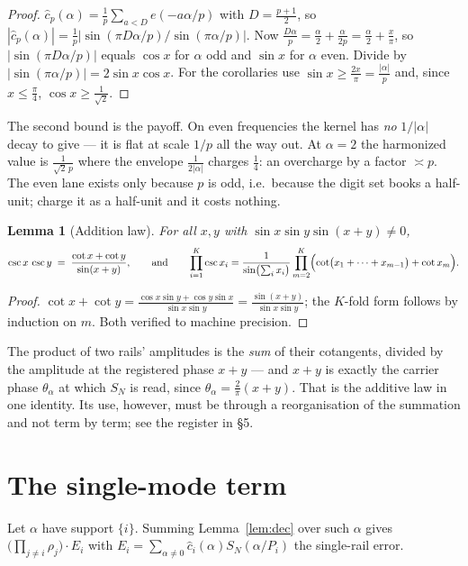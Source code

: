 \documentclass[11pt]{article}
\newtheorem{lemma}[theorem]{Lemma}
\newcommand{\e}[1]{e\!\left(#1\right)}
\begin{document}
\begin{proof}
$\hat c_p(\alpha)=\frac1p\sum_{a<D}\e{-a\alpha/p}$ with $D=\frac{p+1}2$, so
$|\hat c_p(\alpha)|=\frac1p\bigl|\sin(\pi D\alpha/p)/\sin(\pi\alpha/p)\bigr|$.  Now
$\frac{D\alpha}{p}=\frac\alpha2+\frac{\alpha}{2p}=\frac\alpha2+\frac x\pi$, so
$|\sin(\pi D\alpha/p)|$ equals $\cos x$ for $\alpha$ odd and $\sin x$ for $\alpha$ even.
Divide by $|\sin(\pi\alpha/p)|=2\sin x\cos x$.  For the corollaries use
$\sin x\ge\frac{2x}\pi=\frac{|\alpha|}p$ and, since $x\le\frac\pi4$,
$\cos x\ge\frac1{\sqrt2}$.
\end{proof}

The second bound is the payoff.  On even frequencies the kernel has \emph{no} $1/|\alpha|$
decay to give --- it is flat at scale $1/p$ all the way out.  At $\alpha=2$ the
harmonized value is $\frac1{\sqrt2\,p}$ where the envelope $\frac1{2|\alpha|}$ charges
$\frac14$: an overcharge by a factor $\asymp p$.  The even lane exists only because $p$
is odd, i.e.\ because the digit set books a half-unit; charge it as a half-unit and it
costs nothing.

\begin{lemma}[Addition law]\label{lem:add}
For all $x,y$ with $\sin x\sin y\sin(x+y)\ne0$,
\[
\csc x\,\csc y\;=\;\frac{\cot x+\cot y}{\sin(x+y)},
\qquad\text{and}\qquad
\prod_{i=1}^K\csc x_i=\frac{1}{\sin\bigl(\sum_ix_i\bigr)}\prod_{m=2}^{K}
\Bigl(\cot\bigl(x_1+\dots+x_{m-1}\bigr)+\cot x_m\Bigr).
\]
\end{lemma}

\begin{proof}
$\cot x+\cot y=\frac{\cos x\sin y+\cos y\sin x}{\sin x\sin y}=\frac{\sin(x+y)}{\sin x\sin y}$;
the $K$-fold form follows by induction on $m$.  Both verified to machine precision.
\end{proof}

The product of two rails' amplitudes is the \emph{sum} of their cotangents, divided by
the amplitude at the registered phase $x+y$ --- and $x+y$ is exactly the carrier phase
$\theta_\alpha$ at which $S_N$ is read, since $\theta_\alpha=\frac2\pi(x+y)$.  That is
the additive law in one identity.  Its use, however, must be through a reorganisation
of the summation and not term by term; see the register in \S5.

\section{The single-mode term}

Let $\alpha$ have support $\{i\}$.  Summing Lemma~\ref{lem:dec} over such $\alpha$ gives
$\bigl(\prod_{j\ne i}\rho_j\bigr)\cdot E_i$ with
$E_i=\sum_{\alpha\ne0}\hat c_i(\alpha)S_N(\alpha/P_i)$ the single-rail error.
\end{document}
